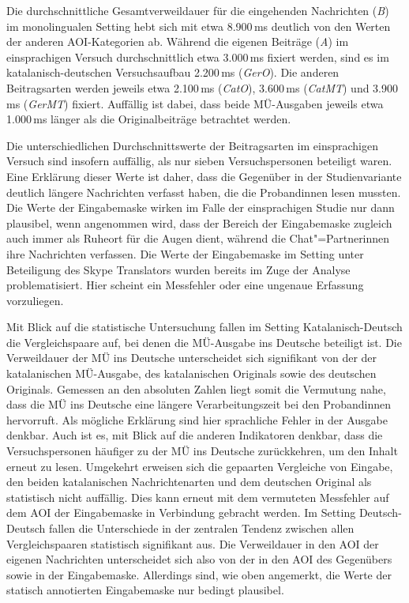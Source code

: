 \begin{sloppypar}
Die durchschnittliche Gesamtverweildauer für die eingehenden Nachrichten (\emph{B}) im monolingualen Setting hebt sich mit etwa 8.900\,ms deutlich von den Werten der anderen AOI-Kategorien ab. Während die eigenen Beiträge (\emph{A}) im einsprachigen Versuch durchschnittlich etwa 3.000\,ms fixiert werden, sind es im katalanisch-deutschen Versuchsaufbau 2.200\,ms (\emph{GerO}). Die anderen Beitragsarten werden jeweils etwa 2.100\,ms (\emph{CatO}), 3.600\,ms (\emph{CatMT}) und 3.900\,ms (\emph{GerMT}) fixiert. Auffällig ist dabei, dass beide MÜ-Ausgaben jeweils etwa 1.000\,ms länger als die Originalbeiträge betrachtet werden.

Die unterschiedlichen Durchschnittswerte der Beitragsarten im einsprachigen Versuch sind insofern auffällig, als nur sieben Versuchspersonen beteiligt waren. Eine Erklärung dieser Werte ist daher, dass die Gegenüber in der Studienvariante deutlich längere Nachrichten verfasst haben, die die Proband{\textperiodcentered}innen lesen mussten. Die Werte der Eingabemaske wirken im Falle der einsprachigen Studie nur dann plausibel, wenn angenommen wird, dass der Bereich der Eingabemaske zugleich auch immer als Ruheort für die Augen dient, während die Chat"=Partner{\textperiodcentered}innen ihre Nachrichten verfassen. Die Werte der Eingabemaske im Setting unter Beteiligung des Skype Translators wurden bereits im Zuge der Analyse problematisiert. Hier scheint ein Messfehler oder eine ungenaue Erfassung vorzuliegen.

Mit Blick auf die statistische Untersuchung fallen im Setting Katalanisch-Deutsch die Vergleichspaare auf, bei denen die MÜ-Ausgabe ins Deutsche beteiligt ist. Die Verweildauer der MÜ ins Deutsche unterscheidet sich signifikant von der der katalanischen MÜ-Ausgabe, des katalanischen Originals sowie des deutschen Originals. Gemessen an den absoluten Zahlen liegt somit die Vermutung nahe, dass die MÜ ins Deutsche eine längere Verarbeitungszeit bei den Proband{\textperiodcentered}innen hervorruft. Als mögliche Erklärung sind hier sprachliche Fehler in der Ausgabe denkbar. Auch ist es, mit Blick auf die anderen Indikatoren denkbar, dass die Versuchspersonen häufiger zu der MÜ ins Deutsche zurückkehren, um den Inhalt erneut zu lesen. Umgekehrt erweisen sich die gepaarten Vergleiche von Eingabe, den beiden katalanischen Nachrichtenarten und dem deutschen Original als statistisch nicht auffällig. Dies kann erneut mit dem vermuteten Messfehler auf dem AOI der Eingabemaske in Verbindung gebracht werden. Im Setting Deutsch-Deutsch fallen die Unterschiede in der zentralen Tendenz zwischen allen Vergleichspaaren statistisch signifikant aus. Die Verweildauer in den AOI der eigenen Nachrichten unterscheidet sich also von der in den AOI des Gegenübers sowie in der Eingabemaske. Allerdings sind, wie oben angemerkt, die Werte der statisch annotierten Eingabemaske nur bedingt plausibel.
\end{sloppypar}

